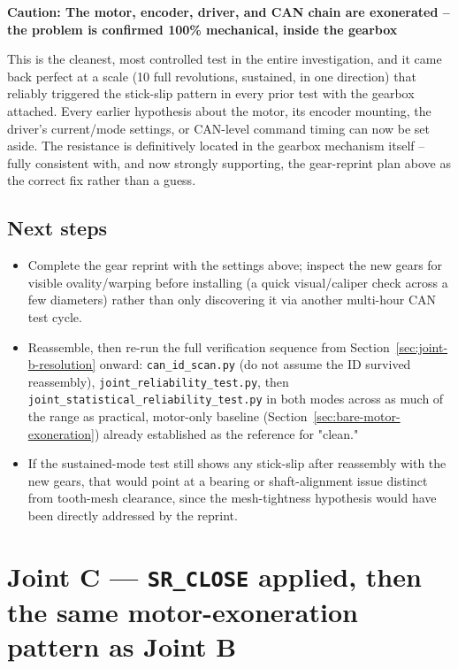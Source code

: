 \documentclass[11pt,letterpaper]{article}
\newenvironment{caution}[1]{%
    \par\addvspace{8pt}%
    \noindent{\color{cautionred}\rule{\linewidth}{0.8pt}}\par\vspace{2pt}
    \noindent\textbf{\color{cautionred}Caution: #1}\par\vspace{2pt}
}{%
    \par\vspace{2pt}\noindent{\color{cautionred}\rule{\linewidth}{0.4pt}}%
    \par\addvspace{8pt}%
}
\begin{document}
\begin{caution}{The motor, encoder, driver, and CAN chain are exonerated -- the problem is confirmed 100\% mechanical, inside the gearbox}
This is the cleanest, most controlled test in the entire investigation, and it came back perfect at a scale (10 full revolutions, sustained, in one direction) that reliably triggered the stick-slip pattern in every prior test with the gearbox attached. Every earlier hypothesis about the motor, its encoder mounting, the driver's current/mode settings, or CAN-level command timing can now be set aside. The resistance is definitively located in the gearbox mechanism itself -- fully consistent with, and now strongly supporting, the gear-reprint plan above as the correct fix rather than a guess.
\end{caution}

\subsection{Next steps}
\begin{itemize}
    \item Complete the gear reprint with the settings above; inspect the new gears for visible ovality/warping before installing (a quick visual/caliper check across a few diameters) rather than only discovering it via another multi-hour CAN test cycle.
    \item Reassemble, then re-run the full verification sequence from Section~\ref{sec:joint-b-resolution} onward: \texttt{can\_id\_scan.py} (do not assume the ID survived reassembly), \texttt{joint\_reliability\_test.py}, then \texttt{joint\_statistical\_reliability\_test.py} in both modes across as much of the range as practical, motor-only baseline (Section~\ref{sec:bare-motor-exoneration}) already established as the reference for "clean."
    \item If the sustained-mode test still shows any stick-slip after reassembly with the new gears, that would point at a bearing or shaft-alignment issue distinct from tooth-mesh clearance, since the mesh-tightness hypothesis would have been directly addressed by the reprint.
\end{itemize}

\section{Joint C --- \texttt{SR\_CLOSE} applied, then the same motor-exoneration pattern as Joint B}
\label{sec:session-joint-c-followup}
\end{document}
